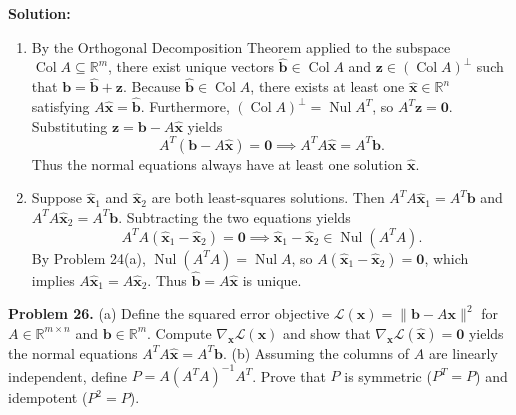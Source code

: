 \documentclass[11pt, letterpaper]{article}
\theoremstyle{definition}
\theoremstyle{remark}
\begin{document}
\textbf{Solution:}
\begin{enumerate}[label=(\alph*)]
    \item By the Orthogonal Decomposition Theorem applied to the subspace $\operatorname{Col} A \subseteq \mathbb{R}^m$, there exist unique vectors $\hat{\mathbf{b}} \in \operatorname{Col} A$ and $\mathbf{z} \in (\operatorname{Col} A)^\perp$ such that $\mathbf{b} = \hat{\mathbf{b}} + \mathbf{z}$. Because $\hat{\mathbf{b}} \in \operatorname{Col} A$, there exists at least one $\hat{\mathbf{x}} \in \mathbb{R}^n$ satisfying $A\hat{\mathbf{x}} = \hat{\mathbf{b}}$. Furthermore, $(\operatorname{Col} A)^\perp = \operatorname{Nul} A^T$, so $A^T \mathbf{z} = \mathbf{0}$. Substituting $\mathbf{z} = \mathbf{b} - A\hat{\mathbf{x}}$ yields
    \[
    A^T(\mathbf{b} - A\hat{\mathbf{x}}) = \mathbf{0} \implies A^T A \hat{\mathbf{x}} = A^T \mathbf{b}.
    \]
    Thus the normal equations always have at least one solution $\hat{\mathbf{x}}$.
    \item Suppose $\hat{\mathbf{x}}_1$ and $\hat{\mathbf{x}}_2$ are both least-squares solutions. Then $A^T A \hat{\mathbf{x}}_1 = A^T \mathbf{b}$ and $A^T A \hat{\mathbf{x}}_2 = A^T \mathbf{b}$. Subtracting the two equations yields
    \[
    A^T A (\hat{\mathbf{x}}_1 - \hat{\mathbf{x}}_2) = \mathbf{0} \implies \hat{\mathbf{x}}_1 - \hat{\mathbf{x}}_2 \in \operatorname{Nul}(A^T A).
    \]
    By Problem 24(a), $\operatorname{Nul}(A^T A) = \operatorname{Nul} A$, so $A(\hat{\mathbf{x}}_1 - \hat{\mathbf{x}}_2) = \mathbf{0}$, which implies $A\hat{\mathbf{x}}_1 = A\hat{\mathbf{x}}_2$. Thus $\hat{\mathbf{b}} = A\hat{\mathbf{x}}$ is unique.
\end{enumerate}

\textbf{Problem 26.} (a) Define the squared error objective $\mathcal{L}(\mathbf{x}) = \|\mathbf{b} - A\mathbf{x}\|^2$ for $A \in \mathbb{R}^{m \times n}$ and $\mathbf{b} \in \mathbb{R}^m$. Compute $\nabla_{\mathbf{x}}\mathcal{L}(\mathbf{x})$ and show that $\nabla_{\mathbf{x}}\mathcal{L}(\hat{\mathbf{x}}) = \mathbf{0}$ yields the normal equations $A^T A \hat{\mathbf{x}} = A^T \mathbf{b}$. (b) Assuming the columns of $A$ are linearly independent, define $P = A(A^T A)^{-1} A^T$. Prove that $P$ is symmetric ($P^T = P$) and idempotent ($P^2 = P$).
\end{document}
